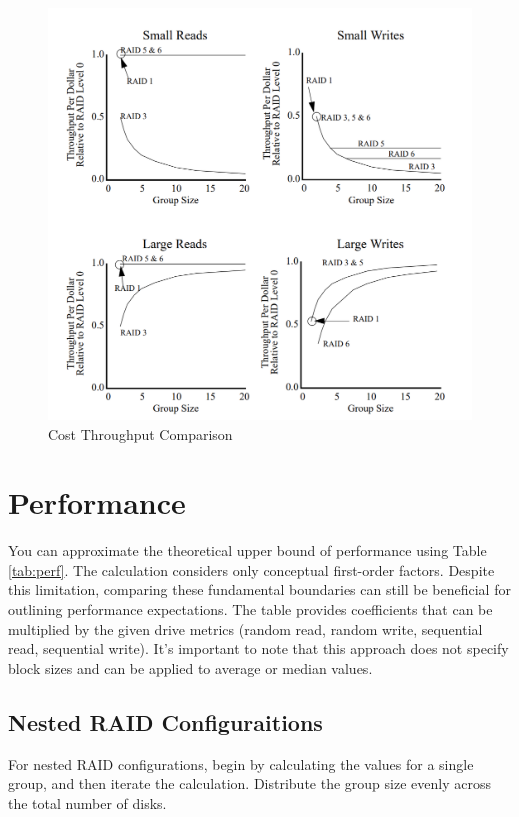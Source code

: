 \documentclass{article}
\begin{document}
\begin{figure}[h]
    \includegraphics[width=\textwidth]{cost-troughput-comparison}
    \caption{Cost Throughput Comparison}
    \label{fig:costthroughput}
\end{figure}
\pagebreak
\section{Performance}
You can approximate the theoretical upper bound of performance using Table \ref{tab:perf}. 
The calculation considers only conceptual first-order factors. Despite this limitation, 
comparing these fundamental boundaries can still be beneficial for outlining performance expectations. 
The table provides coefficients that can be multiplied by the given drive metrics 
(random read, random write, sequential read, sequential write). 
It's important to note that this approach does not specify block sizes and
can be applied to average or median values. \cite{uw:raid}
\subsection{Nested RAID Configuraitions}
For nested RAID configurations, begin by calculating the values for a single group, and then iterate the calculation. Distribute the group size evenly across the total number of disks.
\end{document}
